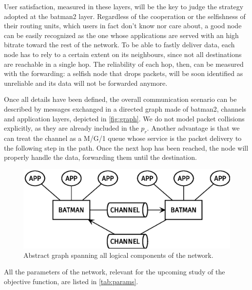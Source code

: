 \documentclass[conference,10.5pt]{IEEEtran}
\begin{document}
User satisfaction, measured in these layers, will be the key to judge the strategy adopted at the \gls{batman2} layer.
Regardless of the cooperation or the selfishness of their routing units, which users in fact don't know nor care about, a good node can be easily recognized as the one whose applications are served with an high bitrate toward the rest of the network.
To be able to fastly deliver data, each node  has to rely to a certain extent on its neighbours, since not all destinations are reachable in a single hop.
The reliability of each hop, then, can be measured with the forwarding: a selfish node that drops packets, will be soon identified as unreliable and its data will not be forwarded anymore.

\smallskip
Once all details have been defined, the overall communication scenario can be described by messages exchanged in a directed graph made of \gls{batman2}, channels and application layers, depicted in \autoref{fig:graph}.
We do not model packet collisions explicitly, as they are already included in the $p_r$. Another advantage is that we can treat the channel as a M/G/1 queue whose service is the packet delivery to the following step in the path.
Once the next hop has been reached, the node will properly handle the data, forwarding them until the destination.

\begin{figure}[h]
  \centering
  \includegraphics[width=\linewidth]{figures/layers_diagram}
  \caption{Abstract graph spanning all logical components of the network.}
  \label{fig:graph}
\end{figure}

All the parameters of the network, relevant for the upcoming study of the objective function, are listed in \autoref{tab:params}.

\renewcommand\theadalign{l}
\end{document}
